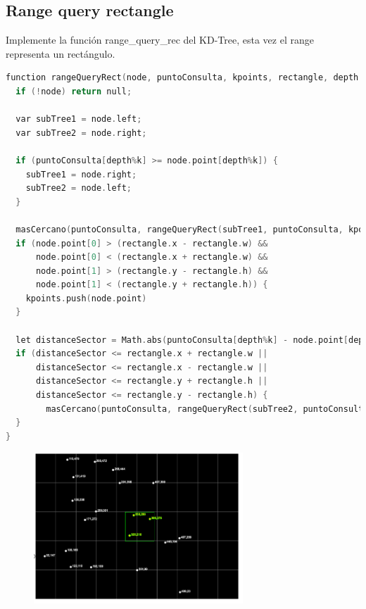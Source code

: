 \subsection{Range query rectangle}
Implemente la función range\_query\_rec del KD-Tree, esta vez el range representa un rectángulo.
\begin{lstlisting}[language=C++,
                   directivestyle={\color{black}}
                   emph={int,char,double,float,unsigned},
                   emphstyle={\color{blue}}
                  ]
function rangeQueryRect(node, puntoConsulta, kpoints, rectangle, depth = 0) {
  if (!node) return null;

  var subTree1 = node.left;
  var subTree2 = node.right;

  if (puntoConsulta[depth%k] >= node.point[depth%k]) {
    subTree1 = node.right;
    subTree2 = node.left;
  }

  masCercano(puntoConsulta, rangeQueryRect(subTree1, puntoConsulta, kpoints, rectangle, depth + 1), node.point);
  if (node.point[0] > (rectangle.x - rectangle.w) &&
      node.point[0] < (rectangle.x + rectangle.w) &&
      node.point[1] > (rectangle.y - rectangle.h) &&
      node.point[1] < (rectangle.y + rectangle.h)) {
    kpoints.push(node.point)
  }

  let distanceSector = Math.abs(puntoConsulta[depth%k] - node.point[depth%k]);
  if (distanceSector <= rectangle.x + rectangle.w ||
      distanceSector <= rectangle.x - rectangle.w ||
      distanceSector <= rectangle.y + rectangle.h ||
      distanceSector <= rectangle.y - rectangle.h) {
        masCercano(puntoConsulta, rangeQueryRect(subTree2, puntoConsulta, kpoints, rectangle, depth + 1), node.point);
  }
}
\end{lstlisting}
\begin{figure}[H]
  \centering
  \includegraphics[width=0.7\textwidth]{images/7a.PNG}
  \label{fig:act-7a}
\end{figure}
